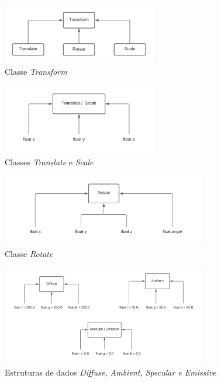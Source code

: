 \documentclass[11pt,a4paper]{report}%
\begin{document}
\begin{figure}[H]
	\centering
	\includegraphics[width=0.6\textwidth]{images/class_transform.png}
	\caption{Classe \emph{Transform}} \label{fig:transform}
\end{figure}
\begin{figure}[H]
	\centering
	\includegraphics[width=0.6\textwidth]{images/class_translate.png}
	\caption{Classes \emph{Translate} e \emph{Scale}} \label{fig:translate}
\end{figure}
\begin{figure}[H]
	\centering
	\includegraphics[width=0.8\textwidth]{images/class_rotate.png}
	\caption{Classe \emph{Rotate}} \label{fig:rotate}
\end{figure}
\begin{figure}[H]
	\centering
	\includegraphics[width=0.8\textwidth]{images/struct_diffuse.png}
	\caption{Estruturas de dados \emph{Diffuse, Ambient, Specular e Emissive}} \label{fig:diffuse}
\end{figure}
\end{document}
